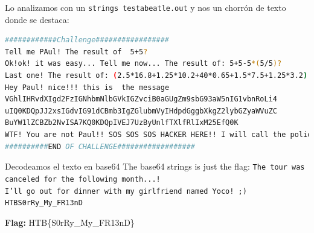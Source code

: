 \documentclass[letterpaper,10pt]{article}
\begin{document}
Lo analizamos con un \texttt{strings testabeatle.out} y nos un chorrón de texto donde se destaca:

\begin{lstlisting}[frame=single,language=bash,caption={bash version}]
############Challenge#################
Tell me PAul! The result of  5+5?
Ok!ok! it was easy... Tell me now... The result of: 5+5-5*(5/5)?
Last one! The result of: (2.5*16.8+1.25*10.2+40*0.65+1.5*7.5+1.25*3.2):40
Hey Paul! nice!!! this is  the message
VGhlIHRvdXIgd2FzIGNhbmNlbGVkIGZvciB0aGUgZm9sbG93aW5nIG1vbnRoLi4
uIQ0KDQpJJ2xsIGdvIG91dCBmb3IgZGlubmVyIHdpdGggbXkgZ2lybGZyaWVuZC
BuYW1lZCBZb2NvISA7KQ0KDQpIVEJ7UzByUnlfTXlfRlIxM25EfQ0K
WTF! You are not Paul!! SOS SOS SOS HACKER HERE!! I will call the police someone want to steal my data!!!
##########END OF CHALLENGE##################
\end{lstlisting}

Decodeamos el texto en base64 The base64 strings is just the flag:
\texttt{The tour was canceled for the following month...!\\
I'll go out for dinner with my girlfriend named Yoco! ;)\\
HTB{S0rRy\_My\_FR13nD}
}
\par

\textbf{Flag: }HTB\{S0rRy\_My\_FR13nD\}
\end{document}
